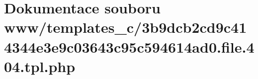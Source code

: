 \section{Dokumentace souboru www/templates\_\-c/3b9dcb2cd9c414344e3e9c03643c95c594614ad0.file.404.tpl.php}
\label{d1/d54/3b9dcb2cd9c414344e3e9c03643c95c594614ad0_8file_8404_8tpl_8php}
